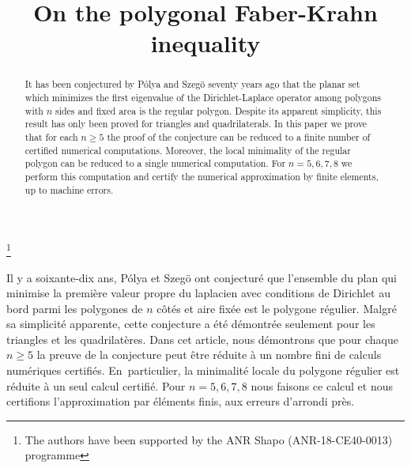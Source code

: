 \documentclass[JEP,XML,SOM,Unicode,ThmDefs,NoFloatCountersInSection,published]{cedram}
\theoremstyle{plain}
\theoremstyle{definition}
\begin{document}
\frontmatter

\title{On the polygonal Faber-Krahn inequality}

\author[\initial{B.} \lastname{Bogosel}]{ }
\address{CMAP, CNRS, École polytechnique,
Institut Polytechnique de Paris,\\
91120 Palaiseau, France}

\author[\initial{D.} \lastname{Bucur}]{ }
\address{Laboratoire de Mathématiques UMR CNRS 5127,
Université Savoie Mont Blanc,\\
Campus Scientifique, 73376 Le-Bourget-Du-Lac, France}

\thanks{The authors have been supported by the ANR Shapo (ANR-18-CE40-0013) programme}

\begin{abstract}
It has been conjectured by Pólya and Szegö seventy years ago that the planar set which minimizes the first eigenvalue of the Dirichlet-Laplace operator among polygons with $n$ sides and fixed area is the regular polygon. Despite its apparent simplicity, this result has only been proved for triangles and quadrilaterals. In this paper we prove that for each $n \ge 5$ the proof of the conjecture can be reduced to a finite number of certified numerical computations. Moreover, the local minimality of the regular polygon can be reduced to a single numerical computation. For $n=5, 6,7, 8$ we perform this computation and certify the numerical approximation by finite elements, up to machine errors.
\end{abstract}





\begin{altabstract}
Il y a soixante-dix ans, Pólya et Szegö ont conjecturé que l'ensemble du plan qui minimise la première valeur propre du laplacien avec conditions de Dirichlet au bord parmi les polygones de $n$ côtés et aire fixée est le polygone régulier. Malgré sa simplicité apparente, cette conjecture a été démontrée seulement pour les triangles et les quadrilatères. Dans cet article, nous démontrons que pour chaque $n \geq 5$ la preuve de la conjecture peut être réduite à un nombre fini de calculs numériques certifiés. En~particulier, la minimalité locale du polygone régulier est réduite à un seul calcul certifié. Pour $n = 5, 6, 7, 8$ nous faisons ce calcul et nous certifions l'approximation par éléments finis, aux erreurs d'arrondi près.
\end{altabstract}
\end{document}
